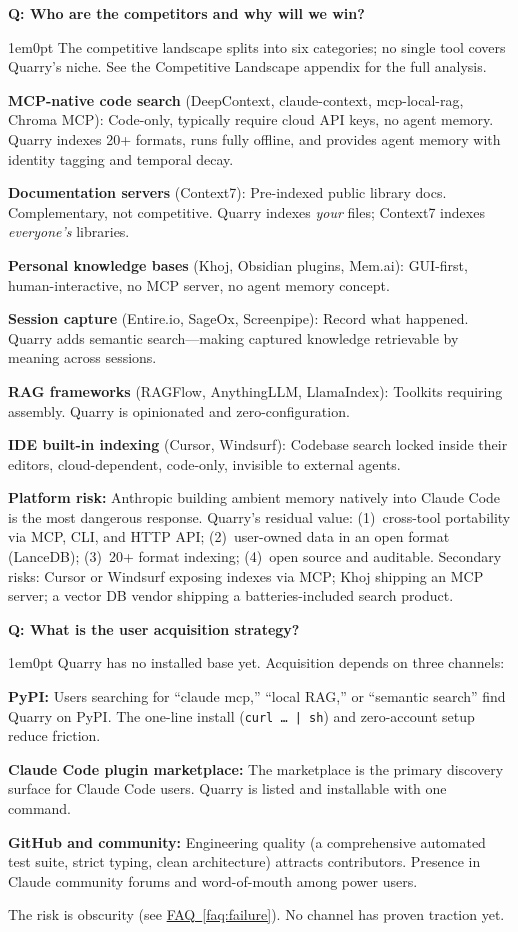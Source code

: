\documentclass[11pt,letterpaper]{article}
\newcounter{faqnum}
\newenvironment{faqpair}[1]{%
  \needspace{4\baselineskip}%
  \vspace{0.5em}%
  \refstepcounter{faqnum}%
  \noindent\textbf{\color{SectionBlue}Q\thefaqnum: #1}\par\nopagebreak[4]%
  \vspace{0.2em}%
  \begin{adjustwidth}{1em}{0pt}%
  \setlength{\parindent}{0pt}%
}{%
  \end{adjustwidth}%
  \vspace{0.5em}%
}
\newcommand{\faqref}[1]{\hyperref[#1]{FAQ~\ref*{#1}}}
\begin{document}
\begin{faqpair}{Who are the competitors and why will we win?}\label{faq:competitors}
  The competitive landscape splits into six categories; no single tool covers
  Quarry's niche. See the Competitive Landscape appendix for the full analysis.

  \textbf{MCP-native code search} (DeepContext, claude-context, mcp-local-rag,
  Chroma MCP): Code-only, typically require cloud API keys, no agent memory.
  Quarry indexes 20+ formats, runs fully offline, and provides agent memory with
  identity tagging and temporal decay.

  \textbf{Documentation servers} (Context7): Pre-indexed public library docs.
  Complementary, not competitive. Quarry indexes \emph{your} files; Context7
  indexes \emph{everyone's} libraries.

  \textbf{Personal knowledge bases} (Khoj, Obsidian plugins, Mem.ai):
  GUI-first, human-interactive, no MCP server, no agent memory concept.

  \textbf{Session capture} (Entire.io, SageOx, Screenpipe): Record what
  happened. Quarry adds semantic search---making captured knowledge retrievable
  by meaning across sessions.

  \textbf{RAG frameworks} (RAGFlow, AnythingLLM, LlamaIndex): Toolkits
  requiring assembly. Quarry is opinionated and zero-configuration.

  \textbf{IDE built-in indexing} (Cursor, Windsurf): Codebase search locked
  inside their editors, cloud-dependent, code-only, invisible to external agents.

  \textbf{Platform risk:} Anthropic building ambient memory natively into
  Claude Code is the most dangerous response. Quarry's residual value:
  (1)~cross-tool portability via MCP, CLI, and HTTP API; (2)~user-owned data in
  an open format (LanceDB); (3)~20+ format indexing; (4)~open source and
  auditable. Secondary risks: Cursor or Windsurf exposing indexes via MCP; Khoj
  shipping an MCP server; a vector DB vendor shipping a batteries-included
  search product.
\end{faqpair}

\begin{faqpair}{What is the user acquisition strategy?}\label{faq:acquisition}
  Quarry has no installed base yet. Acquisition depends on three channels:

  \textbf{PyPI:} Users searching for ``claude mcp,'' ``local RAG,'' or
  ``semantic search'' find Quarry on PyPI. The one-line install
  (\texttt{curl~\ldots~|~sh}) and zero-account setup reduce friction.

  \textbf{Claude Code plugin marketplace:} The marketplace is the primary
  discovery surface for Claude Code users. Quarry is listed and installable
  with one command.

  \textbf{GitHub and community:} Engineering quality (a comprehensive
  automated test suite, strict typing, clean architecture) attracts
  contributors. Presence in Claude community forums and word-of-mouth among
  power users.

  The risk is obscurity (see \faqref{faq:failure}). No channel has proven
  traction yet.
\end{faqpair}
\end{document}
